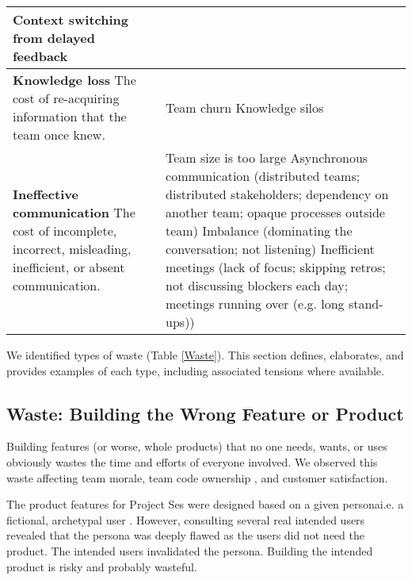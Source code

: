 \begin{table*}[htbp]
\begin{tabular}{|p{2.5in}|p{3.6in}|}
Context switching from delayed feedback                                                                                                                                                                                                                                                                          \\ \hline
\textbf{Knowledge loss} \newline
The cost of re-acquiring information that the team once knew. & 
Team churn \newline
Knowledge silos 
\\ \hline
\textbf{Ineffective communication} \newline 
The cost of incomplete, incorrect, misleading, inefficient, or absent communication.                         & 
Team size is too large \newline Asynchronous communication (distributed teams; distributed stakeholders; dependency on another team; opaque processes outside team) \newline Imbalance (dominating the conversation; not listening) \newline Inefficient meetings (lack of focus; skipping retros; not discussing blockers each day; meetings running over (e.g. long stand-ups)) \\ \hline                  
\end{tabular}
\end{table*}



We identified \numberOfWastes{} types of waste (Table \ref{Waste}). This section defines, elaborates, and provides examples of each type, including associated tensions where available.
\subsection{Waste: Building the Wrong Feature or Product}
Building features (or worse, whole products) that no one needs, wants, or uses obviously wastes the time and efforts of everyone involved. We observed this waste affecting team morale, team code ownership \cite{SedanoTeamCodeOwnership}, and customer satisfaction. 

The product features for Project Ses were designed based on a given persona\textemdash i.e. a fictional, archetypal user \cite{Grudin2002personas}. However, consulting several real intended users revealed that the persona was deeply flawed as the users did not need the product. The intended users invalidated the persona. Building the intended product is risky and probably wasteful. 

